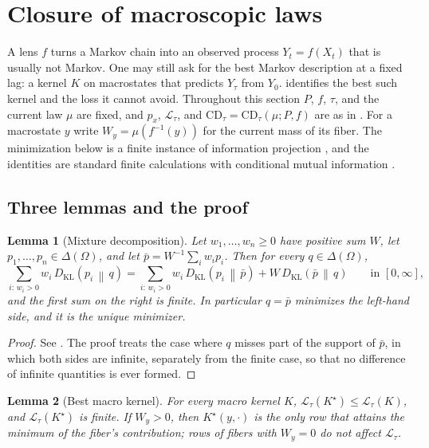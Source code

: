 \documentclass[11pt]{article}
\newtheorem{lemma}{Lemma}[section]
\theoremstyle{definition}
\newcommand{\1}{\mathbf{1}}
\newcommand{\thmNGMacroClosureDeficit}{\Cref{thm:NG_MACRO_CLOSURE_DEFICIT}}
\newcommand{\DKL}[2]{D_{\mathrm{KL}}\!\left(#1\,\middle\|\,#2\right)}
\begin{document}
 \section{Closure of macroscopic laws}\label{sec:closure}

A lens $f$ turns a Markov chain into an observed process $Y_t=f(X_t)$ that is usually not Markov.
One may still ask for the best Markov description at a fixed lag: a kernel $K$ on macrostates that predicts $Y_\tau$ from $Y_0$.
\thmNGMacroClosureDeficit{} identifies the best such kernel and the loss it cannot avoid.
Throughout this section $P$, $f$, $\tau$, and the current law $\mu$ are fixed, and $p_x$, $\mathcal{L}_\tau$, and $\mathrm{CD}_\tau=\mathrm{CD}_\tau(\mu;P,f)$ are as in .
For a macrostate $y$ write $W_y=\mu(f^{-1}(y))$ for the current mass of its fiber.
The minimization below is a finite instance of information projection \citep{Csiszar1975}, and the identities are standard finite calculations with conditional mutual information \citep{CoverThomas2006}.

\subsection{Three lemmas and the proof}

\begin{lemma}[Mixture decomposition]\label{lem:closure_kl_mixture}
Let $w_1,\dots,w_n\ge 0$ have positive sum $W$, let $p_1,\dots,p_n\in\Delta(\Omega)$, and let $\bar p=W^{-1}\sum_i w_ip_i$. Then for every $q\in\Delta(\Omega)$,
\[
  \sum_{i:\,w_i>0}w_i\,\DKL{p_i}{q}=\sum_{i:\,w_i>0}w_i\,\DKL{p_i}{\bar p}+W\,\DKL{\bar p}{q}\qquad\text{in }[0,\infty],
\]
and the first sum on the right is finite.
In particular $q=\bar p$ minimizes the left-hand side, and it is the unique minimizer.
\end{lemma}

\begin{proof}
See .
The proof treats the case where $q$ misses part of the support of $\bar p$, in which both sides are infinite, separately from the finite case, so that no difference of infinite quantities is ever formed.
\end{proof}

\begin{lemma}[Best macro kernel]\label{lem:closure_best_macro_kernel}
For every macro kernel $K$, $\mathcal{L}_\tau(K^\star)\le\mathcal{L}_\tau(K)$, and $\mathcal{L}_\tau(K^\star)$ is finite.
If $W_y>0$, then $K^\star(y,\cdot)$ is the only row that attains the minimum of the fiber's contribution; rows of fibers with $W_y=0$ do not affect $\mathcal{L}_\tau$.
\end{lemma}
\end{document}
